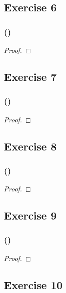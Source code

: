\documentclass[14pt]{extarticle}
\begin{document}
\subsection{Exercise 6}

\subsubsection{()}

\begin{proof}

\end{proof}

\subsection{Exercise 7}

\subsubsection{()}

\begin{proof}

\end{proof}

\subsection{Exercise 8}

\subsubsection{()}

\begin{proof}

\end{proof}

\subsection{Exercise 9}

\subsubsection{()}

\begin{proof}

\end{proof}

\subsection{Exercise 10}
\end{document}
